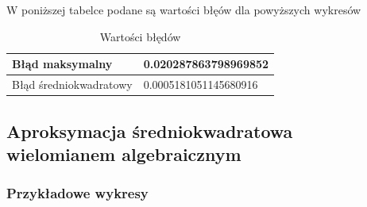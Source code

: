 \documentclass{article}
\begin{document}
\noindent
W poniższej tabelce podane są wartości błęów dla powyższych wykresów

\begin{table}[!ht]
    \centering
    \begin{tabular}{|l|l|}
    \hline
        Błąd maksymalny & 0.020287863798969852 \\ \hline
        Błąd średniokwadratowy & 0.0005181051145680916 \\ \hline
    \end{tabular}
    \caption{Wartości błędów}
\end{table}

\subsection{Aproksymacja średniokwadratowa wielomianem algebraicznym}

\subsubsection{Przykładowe wykresy}

\noindent
\end{document}
